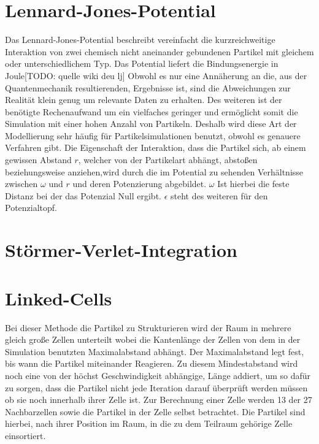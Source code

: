 \documentclass[
	12pt,
	a4paper,
	BCOR10mm,
	DIV14,
	headsepline,
]{scrreprt}
\begin{document}
\section{Lennard-Jones-Potential}
Das Lennard-Jones-Potential beschreibt vereinfacht die kurzreichweitige Interaktion von zwei chemisch nicht aneinander gebundenen Partikel mit gleichem oder unterschiedlichem Typ. Das Potential liefert die Bindungsenergie in Joule[TODO: quelle wiki deu lj] Obwohl es nur eine Annäherung an die, aus der Quantenmechanik resultierenden, Ergebnisse ist, sind die Abweichungen zur Realität klein genug um relevante Daten zu erhalten. Des weiteren ist der benötigte Rechenaufwand um ein vielfaches geringer und ermöglicht somit die Simulation mit einer hohen Anzahl von Partikeln. Deshalb wird diese Art der Modellierung sehr häufig für Partikelsimulationen benutzt, obwohl es genauere Verfahren gibt.
Die Eigenschaft der Interaktion, dass die Partikel sich, ab einem gewissen Abstand $r$, welcher von der Partikelart abhängt, abstoßen beziehungsweise anziehen,wird durch die im Potential zu sehenden Verhältnisse zwischen $\omega$ und $r$ und deren Potenzierung abgebildet. $\omega$ Ist hierbei die feste Distanz bei der das Potenzial Null ergibt. $\epsilon$ steht des weiteren für den Potenzialtopf.
\section{Störmer-Verlet-Integration}
\section{Linked-Cells}
Bei dieser Methode die Partikel zu Strukturieren wird der Raum in mehrere gleich große Zellen unterteilt wobei die Kantenlänge der Zellen von dem in der Simulation benutzten Maximalabstand abhängt. Der Maximalabstand legt fest, bis wann die Partikel miteinander Reagieren. Zu diesem Mindestabstand wird noch eine von der höchst Geschwindigkeit abhängige, Länge addiert, um so dafür zu sorgen, dass die Partikel nicht jede Iteration darauf überprüft werden müssen ob sie noch innerhalb ihrer Zelle ist.%
Zur Berechnung einer Zelle werden 13 der 27 Nachbarzellen sowie die Partikel in der Zelle selbst betrachtet. Die Partikel sind hierbei, nach ihrer Position im Raum, in die zu dem Teilraum gehörige Zelle einsortiert.  
\end{document}

